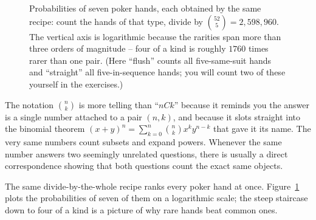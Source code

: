 \begin{figure}[H]
\centering
{}
\caption{Probabilities of seven poker hands, each obtained by the same recipe: count the
hands of that type, divide by $\binom{52}{5}=2{,}598{,}960$. The vertical axis is
logarithmic because the rarities span more than three orders of magnitude -- four of a kind
is roughly $1760$ times rarer than one pair. (Here ``flush'' counts all five-same-suit hands
and ``straight'' all five-in-sequence hands; you will count two of these yourself in the
exercises.)}
\label{ch2:fig-poker}
\end{figure}

\begin{aestheticbox}
The notation $\binom{n}{k}$ is more telling than ``$nCk$'' because it reminds you the answer
is a single number attached to a pair $(n,k)$, and because it slots straight into the
binomial theorem
$(x+y)^n = \sum_{k=0}^n \binom{n}{k} x^k y^{n-k}$ that gave it its name. The very same numbers count subsets and expand
powers. Whenever the same number answers two seemingly unrelated questions, there is
usually a direct correspondence showing that both questions count the exact same objects.
\end{aestheticbox}

The same divide-by-the-whole recipe ranks every poker hand at once.
Figure~\ref{ch2:fig-poker} plots the probabilities of seven of them on a logarithmic
scale; the steep staircase down to four of a kind is a picture of why rare hands beat
common ones.

